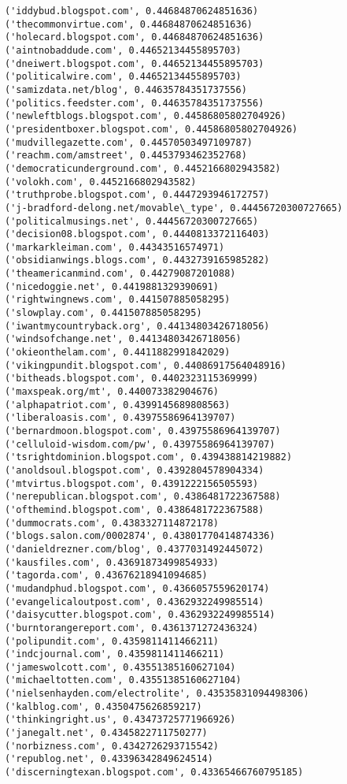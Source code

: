 \documentclass[11pt]{article}
\begin{document}
\begin{Verbatim}[commandchars=\\\{\}]
('iddybud.blogspot.com', 0.44684870624851636)
('thecommonvirtue.com', 0.44684870624851636)
('holecard.blogspot.com', 0.44684870624851636)
('aintnobaddude.com', 0.44652134455895703)
('dneiwert.blogspot.com', 0.44652134455895703)
('politicalwire.com', 0.44652134455895703)
('samizdata.net/blog', 0.44635784351737556)
('politics.feedster.com', 0.44635784351737556)
('newleftblogs.blogspot.com', 0.44586805802704926)
('presidentboxer.blogspot.com', 0.44586805802704926)
('mudvillegazette.com', 0.44570503497109787)
('reachm.com/amstreet', 0.4453793462352768)
('democraticunderground.com', 0.4452166802943582)
('volokh.com', 0.4452166802943582)
('truthprobe.blogspot.com', 0.4447293946172757)
('j-bradford-delong.net/movable\_type', 0.44456720300727665)
('politicalmusings.net', 0.44456720300727665)
('decision08.blogspot.com', 0.4440813372116403)
('markarkleiman.com', 0.44343516574971)
('obsidianwings.blogs.com', 0.4432739165985282)
('theamericanmind.com', 0.44279087201088)
('nicedoggie.net', 0.4419881329390691)
('rightwingnews.com', 0.441507885058295)
('slowplay.com', 0.441507885058295)
('iwantmycountryback.org', 0.44134803426718056)
('windsofchange.net', 0.44134803426718056)
('okieonthelam.com', 0.4411882991842029)
('vikingpundit.blogspot.com', 0.44086917564048916)
('bitheads.blogspot.com', 0.4402323115369999)
('maxspeak.org/mt', 0.440073382904676)
('alphapatriot.com', 0.4399145689808563)
('liberaloasis.com', 0.43975586964139707)
('bernardmoon.blogspot.com', 0.43975586964139707)
('celluloid-wisdom.com/pw', 0.43975586964139707)
('tsrightdominion.blogspot.com', 0.439438814219882)
('anoldsoul.blogspot.com', 0.4392804578904334)
('mtvirtus.blogspot.com', 0.4391222156505593)
('nerepublican.blogspot.com', 0.4386481722367588)
('ofthemind.blogspot.com', 0.4386481722367588)
('dummocrats.com', 0.4383327114872178)
('blogs.salon.com/0002874', 0.43801770414874336)
('danieldrezner.com/blog', 0.4377031492445072)
('kausfiles.com', 0.43691873499854933)
('tagorda.com', 0.43676218941094685)
('mudandphud.blogspot.com', 0.4366057559620174)
('evangelicaloutpost.com', 0.4362932249985514)
('daisycutter.blogspot.com', 0.4362932249985514)
('burntorangereport.com', 0.4361371272436324)
('polipundit.com', 0.4359811411466211)
('indcjournal.com', 0.4359811411466211)
('jameswolcott.com', 0.43551385160627104)
('michaeltotten.com', 0.43551385160627104)
('nielsenhayden.com/electrolite', 0.43535831094498306)
('kalblog.com', 0.4350475626859217)
('thinkingright.us', 0.43473725771966926)
('janegalt.net', 0.4345822711750277)
('norbizness.com', 0.4342726293715542)
('republog.net', 0.43396342849624514)
('discerningtexan.blogspot.com', 0.43365466760795185)

\end{Verbatim}
\end{document}
